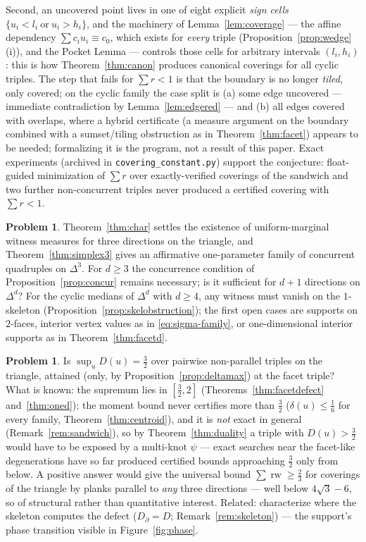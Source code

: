 \documentclass[11pt,reqno]{amsart}
\theoremstyle{plain}
\theoremstyle{definition}
\newtheorem{problem}[theorem]{Problem}
\theoremstyle{remark}
\newcommand{\rw}{\operatorname{rw}}
\begin{document}
Second, an uncovered point lives in one of eight explicit \emph{sign cells}
$\{u_i<l_i\ \text{or}\ u_i>h_i\}$, and the machinery of
Lemma~\ref{lem:coverage} --- the affine dependency $\sum c_iu_i\equiv c_0$,
which exists for \emph{every} triple (Proposition~\ref{prop:wedge}(i)), and
the Pocket Lemma --- controls those cells for arbitrary intervals
$(l_i,h_i)$: this is how Theorem~\ref{thm:canon} produces canonical coverings
for all cyclic triples. The step that fails for $\sum r<1$ is that the
boundary is no longer \emph{tiled}, only covered; on the cyclic family the
case split is (a) some edge uncovered --- immediate contradiction by
Lemma~\ref{lem:edgered} --- and (b) all edges covered with overlaps, where a
hybrid certificate (a measure argument on the boundary combined with a
sumset/tiling obstruction as in Theorem~\ref{thm:facet}) appears to be
needed; formalizing it is the program, not a result of this paper.
Exact experiments (archived in \texttt{covering\_constant.py}) support the
conjecture: float-guided minimization of $\sum r$ over exactly-verified
coverings of the sandwich and two further non-concurrent triples never
produced a certified covering with $\sum r<1$.
\begin{problem}\label{prob:suff}
Theorem~\ref{thm:char} settles the existence of uniform-marginal witness
measures for three directions on the triangle, and Theorem~\ref{thm:simplex3}
gives an affirmative one-parameter family of concurrent quadruples on
$\Delta^3$. For $d\ge3$ the concurrence condition of
Proposition~\ref{prop:concur} remains necessary; is it sufficient for $d+1$
directions on $\Delta^d$? For the cyclic medians of $\Delta^d$ with $d\ge4$,
any witness must vanish on the $1$-skeleton
(Proposition~\ref{prop:skelobstruction}); the first open cases are supports on
$2$-faces, interior vertex values as in \eqref{eq:sigma-family}, or
one-dimensional interior supports as in Theorem~\ref{thm:facetd}.
\end{problem}
\begin{problem}\label{prob:defect}
Is $\sup_uD(u)=\tfrac32$ over pairwise non-parallel triples on the triangle,
attained (only, by Proposition~\ref{prop:deltamax}) at the facet triple? What
is known: the supremum lies in $[\tfrac32,2]$ (Theorems~\ref{thm:facetdefect}
and~\ref{thm:oned}); the moment bound never certifies more than $\tfrac32$
($\delta(u)\le\tfrac16$ for every family, Theorem~\ref{thm:centroid}), and it
is \emph{not} exact in general (Remark~\ref{rem:sandwich}), so by
Theorem~\ref{thm:duality} a triple with $D(u)>\tfrac32$ would have to be
exposed by a multi-knot $\psi$ --- exact searches near the facet-like
degenerations have so far produced certified bounds approaching $\tfrac32$
only from below. A positive answer would give the universal bound
$\sum\rw\ge\tfrac23$ for coverings of the triangle by planks parallel to
\emph{any} three directions --- well below $4\sqrt3-6$, so of structural
rather than quantitative interest. Related: characterize where the skeleton
computes the defect ($D_\partial=D$; Remark~\ref{rem:skeleton}) --- the
support's phase transition visible in Figure~\ref{fig:phase}.
\end{problem}
\end{document}
